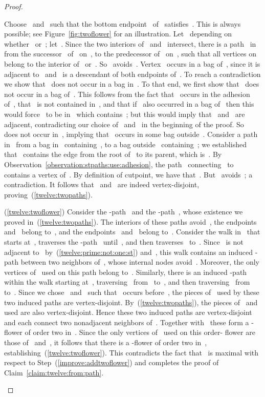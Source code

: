 \begin{proof}
\begin{claimproof}
Choose~ and~ such that the bottom endpoint~ of~ satisfies~. This is always possible; see Figure~\ref{fig:twoflower} for an illustration. Let~ depending on whether~ or~; let~. Since the two interiors of~ and~ intersect, there is a path~ in~ from the successor~ of~ on~, to the predecessor of~ on~, such that all vertices on~ belong to the interior of~ or~. So~ avoids~. Vertex~ occurs in a bag of~, since it is adjacent to~ and~ is a descendant of both endpoints of~. To reach a contradiction we show that~ does not occur in a bag in~. To that end, we first show that~ does not occur in a bag of~. This follows from the fact that~ occurs in the adhesion of~, that~ is not contained in~, and that if~ also occurred in a bag of~ then this would force~ to be in~ which contains~; but this would imply that~ and~ are adjacent, contradicting our choice of~ and~ in the beginning of the proof. So~ does not occur in~, implying that~ occurs in some bag outside~. Consider a path~ in~ from a bag in~ containing~, to a bag outside~ containing~; we established that~ contains the edge from the root of~ to its parent, which is~. By Observation~\ref{observation:stpaths:use:adhesion}, the path~ connecting~ to~ contains a vertex of~. By definition of cutpoint, we have that~. But~ avoids~; a contradiction. It follows that~ and~ are indeed vertex-disjoint, proving~(\ref{twelve:twopaths}).

(\ref{twelve:twoflower}) Consider the -path~ and the -path~, whose existence we proved in~(\ref{twelve:twopaths}). The interiors of these paths avoid~, the endpoints~ and~ belong to~, and the endpoints~ and~ belong to~. Consider the walk in~ that starts at~, traverses the -path~ until~, and then traverses~ to~. Since~ is not adjacent to~ by~(\ref{twelve:prime:not:one:st}) and~, this walk contains an induced -path between two neighbors of~, whose internal nodes avoid~. Moreover, the only vertices of~ used on this path belong to~. Similarly, there is an induced -path within the walk starting at~, traversing~ from~ to~, and then traversing~ from~ to~. Since we chose~ and~ such that~ occurs before~, the pieces of~ used by these two induced paths are vertex-disjoint. By~(\ref{twelve:twopaths}), the pieces of~ and~ used are also vertex-disjoint. Hence these two induced paths are vertex-disjoint and each connect two nonadjacent neighbors of~. Together with~ these form a -flower of order two in~. Since the only vertices of~ used on this order- flower are those of~ and~, it follows that there is a -flower of order two in~, establishing~(\ref{twelve:twoflower}). This contradicts the fact that~ is maximal with respect to Step~(\ref{improve:addtwoflower}) and completes the proof of Claim~\ref{claim:twelve:from:path}.
\end{claimproof}


\end{proof}
